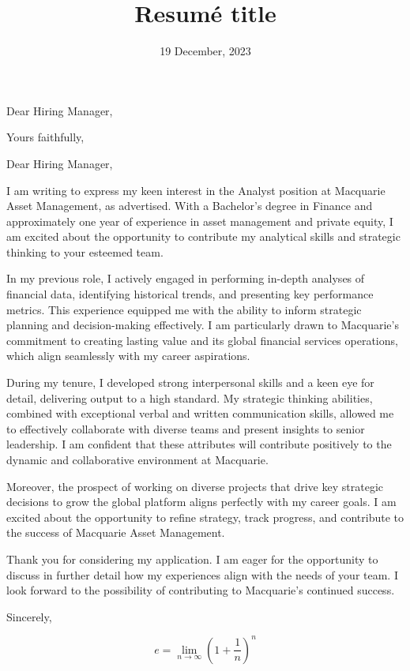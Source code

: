 \documentclass[11pt,a4paper,sans]{moderncv}        %
\title{Resumé title}                               %
\begin{document}
\date{19 December, 2023}
\opening{Dear Hiring Manager,}
\closing{Yours faithfully,}         %
\makelettertitle

Dear Hiring Manager,

I am writing to express my keen interest in the Analyst position at Macquarie Asset Management, as advertised. With a Bachelor's degree in Finance and approximately one year of experience in asset management and private equity, I am excited about the opportunity to contribute my analytical skills and strategic thinking to your esteemed team.

In my previous role, I actively engaged in performing in-depth analyses of financial data, identifying historical trends, and presenting key performance metrics. This experience equipped me with the ability to inform strategic planning and decision-making effectively. I am particularly drawn to Macquarie's commitment to creating lasting value and its global financial services operations, which align seamlessly with my career aspirations.

During my tenure, I developed strong interpersonal skills and a keen eye for detail, delivering output to a high standard. My strategic thinking abilities, combined with exceptional verbal and written communication skills, allowed me to effectively collaborate with diverse teams and present insights to senior leadership. I am confident that these attributes will contribute positively to the dynamic and collaborative environment at Macquarie.

Moreover, the prospect of working on diverse projects that drive key strategic decisions to grow the global platform aligns perfectly with my career goals. I am excited about the opportunity to refine strategy, track progress, and contribute to the success of Macquarie Asset Management.

Thank you for considering my application. I am eager for the opportunity to discuss in further detail how my experiences align with the needs of your team. I look forward to the possibility of contributing to Macquarie's continued success.

Sincerely,

\[ e=\lim_{n \to \infty} \left(1+\frac{1}{n}\right)^n \]

\makeletterclosing
\end{document}
